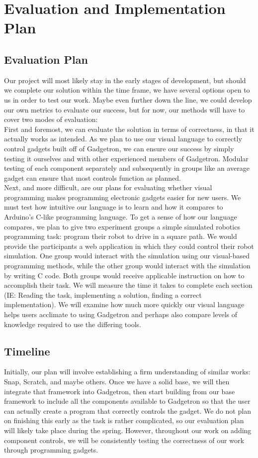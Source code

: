 \documentclass[12pt]{article}
\begin{document}
\section{Evaluation and Implementation Plan}

\subsection{Evaluation Plan}
Our project will most likely stay in the early stages of development, but should we complete our solution within the time frame, we have several options open to us in order to test our work. Maybe even further down the line, we could develop our own metrics to evaluate our success, but for now, our methods will have to cover two modes of evaluation:\\[7pt]
First and foremost, we can evaluate the solution in terms of correctness, in that it actually works as intended. As we plan to use our visual language to correctly control gadgets built off of Gadgetron, we can ensure our success by simply testing it ourselves and with other experienced members of Gadgetron. Modular testing of each component separately and subsequently in groups like an average gadget can ensure that most controls function as planned.\\[7pt]
Next, and more difficult, are our plans for evaluating whether visual programming makes programming electronic gadgets easier for new users. We must test how intuitive our language is to learn and how it compares to Arduino's C-like programming language. To get a sense of how our language compares, we plan to give two experiment groups a simple simulated robotics programming task: program their robot to drive in a square path. We would provide the participants a web application in which they could control their robot simulation. One group would interact with the simulation using our visual-based programming methods, while the other group would interact with the simulation by writing C code. Both groups would receive applicable instruction on how to accomplish their task. We will measure the time it takes to complete each section (IE: Reading the task, implementing a solution, finding a correct implementation). We will examine how much more quickly our visual language helps users acclimate to using Gadgetron and perhaps also compare levels of knowledge required to use the differing tools.

\subsection{Timeline}
Initially, our plan will involve establishing a firm understanding of similar works: Snap, Scratch, and maybe others. Once we have a solid base, we will then integrate that framework into Gadgetron, then start building from our base framework to include all the components available to Gadgetron so that the user can actually create a program that correctly controls the gadget. We do not plan on finishing this early as the task is rather complicated, so our evaluation plan will likely take place during the spring. However, throughout our work on adding component controls, we will be consistently testing the correctness of our work through programming gadgets.



\end{document}
